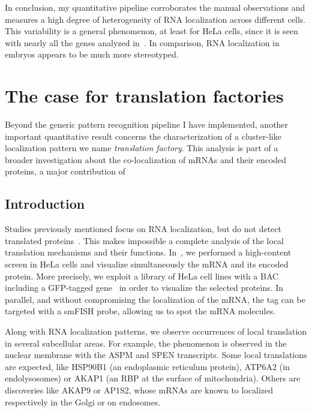 In conclusion, my quantitative pipeline corroborates the manual observations and measures a high degree of heterogeneity of \ac{RNA} localization across different cells.
This variability is a general phenomenon, at least for HeLa cells, since it is seen with nearly all the genes analyzed in~\cite{CHOUAIB_2020}.
In comparison, \ac{RNA} localization in embryos appears to be much more stereotyped.

\section{The case for translation factories}
\label{sec:translation_factories}

Beyond the generic pattern recognition pipeline I have implemented, another important quantitative result concerns the characterization of a cluster-like localization pattern we name \emph{translation factory}.
This analysis is part of a broader investigation about the co-localization of \ac{mRNA}s and their encoded proteins, a major contribution of~\cite{CHOUAIB_2020}

\subsection{Introduction}
\label{subsec:introduction_translation_factories}

Studies previously mentioned focus on \ac{RNA} localization, but do not detect translated proteins~\cite{lecuyer_global_2007, battich_image-based_2013, Chen_2015, eng_seqfish_2019, Xia_2019}.
This makes impossible a complete analysis of the local translation mechanisms and their functions.
In~\cite{CHOUAIB_2020}, we performed a high-content screen in HeLa cells and visualize simultaneously the \ac{mRNA} and its encoded protein.
More precisely, we exploit a library of HeLa cell lines with a \ac{BAC} including a \ac{GFP}-tagged gene~\cite{poser_bac_2008} in order to visualize the selected proteins.
In parallel, and without compromising the localization of the \ac{mRNA}, the tag can be targeted with a \ac{smFISH} probe, allowing us to spot the \ac{mRNA} molecules.

Along with \ac{RNA} localization patterns, we observe occurrences of local translation in several subcellular areas.
For example, the phenomenon is observed in the nuclear membrane with the ASPM and SPEN transcripts.
Some local translations are expected, like HSP90B1 (an endoplasmic reticulum protein), ATP6A2 (in endolysosomes) or AKAP1 (an \ac{RBP} at the surface of mitochondria).
Others are discoveries like AKAP9 or AP1S2, whose \ac{mRNA}s are known to localized respectively in the Golgi or on endosomes.


